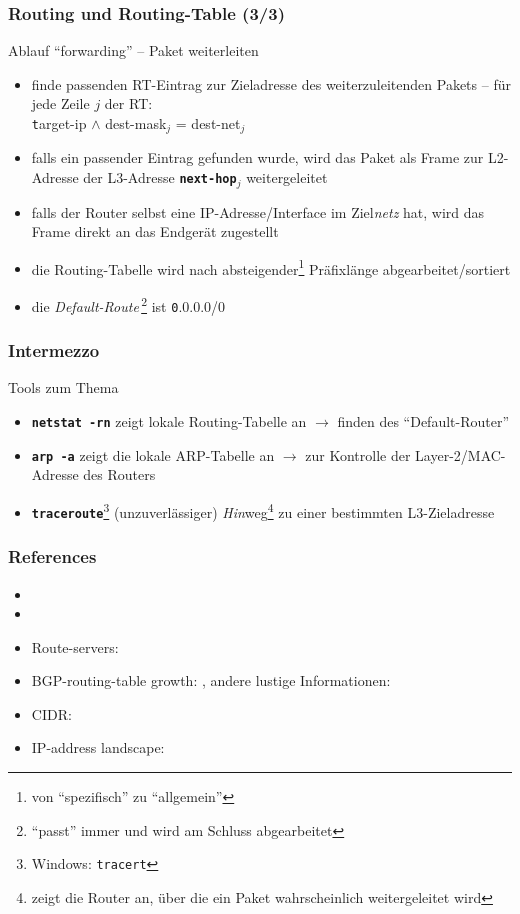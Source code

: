 \documentclass{beamer}
\begin{document}
\begin{frame}
\frametitle{Routing und Routing-Table (3/3)}
Ablauf ``forwarding'' -- Paket weiterleiten
\begin{itemize}
  \item{finde passenden RT-Eintrag zur Zieladresse des weiterzuleitenden Pakets -- f\"ur jede Zeile \texttt{$j$} der RT:
    \\ {\texttt target-ip \textbf{$\wedge$} dest-mask$_{j}$ = dest-net$_{j}$}}
  \item{falls ein passender Eintrag gefunden wurde, wird das Paket als Frame zur L2-Adresse der L3-Adresse \textbf{\texttt{next-hop$_{j}$}} weitergeleitet}
  \item{falls der Router selbst eine IP-Adresse/Interface im Ziel{\em netz} hat, wird das Frame direkt an das Endger\"at zugestellt}
	\item{die Routing-Tabelle wird nach absteigender\footnote{von ``spezifisch'' zu ``allgemein''} Pr\"afixl\"ange abgearbeitet/sortiert}
	\item{die {\em Default-Route}\,\footnote{``passt'' immer und wird am Schluss abgearbeitet} ist {\texttt 0.0.0.0/0}}
\end{itemize}
\end{frame}

\begin{frame}
\frametitle{Intermezzo}
Tools zum Thema
\begin{itemize}
	\item{\textbf{\texttt{netstat -rn}} zeigt lokale Routing-Tabelle an $\rightarrow$ finden des ``Default-Router''}
	\item{\textbf{\texttt{arp -a}} zeigt die lokale ARP-Tabelle an $\rightarrow$ zur Kontrolle der Layer-2/MAC-Adresse des Routers}
	\item{\textbf{\texttt{traceroute}}\footnote{Windows: \texttt{tracert}} (unzuverl\"assiger) {\em Hin}weg\footnote{zeigt die Router an, \"uber die ein Paket wahrscheinlich weitergeleitet wird} zu einer bestimmten L3-Zieladresse}
\end{itemize}
\end{frame}



\begin{frame}
\frametitle{References}
\begin{itemize}
	\item{}
	\item{}
	\item{Route-servers: }
	\item{BGP-routing-table growth: , andere lustige Informationen: }
	\item{CIDR: }
	\item{IP-address landscape: }
\end{itemize}
\end{frame}
\end{document}
